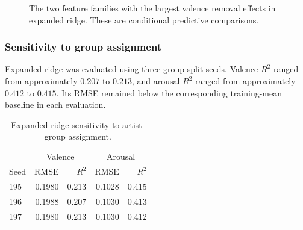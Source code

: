 \begin{figure}[ht]
\centering
{}
\caption{The two feature families with the largest valence removal effects in expanded ridge. These are conditional predictive comparisons.}
\label{fig:ablation}
\end{figure}

\subsubsection{Sensitivity to group assignment}

Expanded ridge was evaluated using three group-split seeds. Valence $R^2$ ranged from approximately $0.207$ to $0.213$, and arousal $R^2$ ranged from approximately $0.412$ to $0.415$. Its RMSE remained below the corresponding training-mean baseline in each evaluation.

\begin{table}[ht]
\centering
\caption{Expanded-ridge sensitivity to artist-group assignment.}
\label{tab:sensitivity}
\begin{tabular}{lrrrr}
\toprule
& \multicolumn{2}{c}{Valence}
& \multicolumn{2}{c}{Arousal} \\
Seed & RMSE & $R^2$ & RMSE & $R^2$ \\
\midrule
195 & 0.1980 & 0.213 & 0.1028 & 0.415 \\
196 & 0.1988 & 0.207 & 0.1030 & 0.413 \\
197 & 0.1980 & 0.213 & 0.1030 & 0.412 \\
\bottomrule
\end{tabular}
\end{table}

